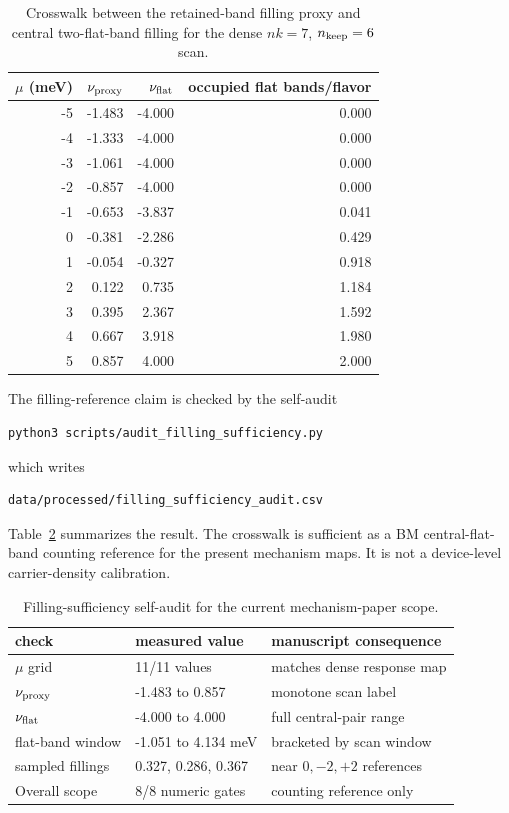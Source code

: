 \documentclass[aps,prb,preprint,superscriptaddress,floatfix,nofootinbib]{revtex4-2}
\begin{document}
\begin{table}[h]
\caption{Crosswalk between the retained-band filling proxy and central
two-flat-band filling for the dense $nk=7$, $n_{\rm keep}=6$ scan.}
\label{tab:sm_filling_crosswalk}
\begin{ruledtabular}
\begin{tabular}{rrrr}
$\mu$ (meV) & $\nu_{\rm proxy}$ & $\nu_{\rm flat}$ & occupied flat bands/flavor\\
\hline
-5 & -1.483 & -4.000 & 0.000\\
-4 & -1.333 & -4.000 & 0.000\\
-3 & -1.061 & -4.000 & 0.000\\
-2 & -0.857 & -4.000 & 0.000\\
-1 & -0.653 & -3.837 & 0.041\\
 0 & -0.381 & -2.286 & 0.429\\
 1 & -0.054 & -0.327 & 0.918\\
 2 &  0.122 &  0.735 & 1.184\\
 3 &  0.395 &  2.367 & 1.592\\
 4 &  0.667 &  3.918 & 1.980\\
 5 &  0.857 &  4.000 & 2.000\\
\end{tabular}
\end{ruledtabular}
\end{table}

The filling-reference claim is checked by the self-audit
\begin{verbatim}
python3 scripts/audit_filling_sufficiency.py
\end{verbatim}
which writes
\begin{verbatim}
data/processed/filling_sufficiency_audit.csv
\end{verbatim}
Table~\ref{tab:sm_filling_sufficiency} summarizes the result.  The crosswalk
is sufficient as a BM central-flat-band counting reference for the present
mechanism maps.  It is not a device-level carrier-density calibration.

\begin{table}[h]
\caption{Filling-sufficiency self-audit for the current mechanism-paper scope.}
\label{tab:sm_filling_sufficiency}
\small
\begin{ruledtabular}
\begin{tabular}{lll}
check & measured value & manuscript consequence\\
\hline
$\mu$ grid & 11/11 values & matches dense response map\\
$\nu_{\rm proxy}$ & -1.483 to 0.857 & monotone scan label\\
$\nu_{\rm flat}$ & -4.000 to 4.000 & full central-pair range\\
flat-band window & -1.051 to 4.134 meV & bracketed by scan window\\
sampled fillings & 0.327, 0.286, 0.367 & near $0,-2,+2$ references\\
Overall scope & 8/8 numeric gates & counting reference only\\
\end{tabular}
\end{ruledtabular}
\end{table}
\end{document}
